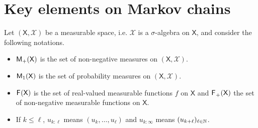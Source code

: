 \documentclass[english,graybox,envcountchap,envcountsame,sectrefs,shortlabels]{svmono}
\theoremstyle{style}
\newcommand{\Xset}{\mathsf{X}}
\newcommand{\Xsigma}{\mathcal{X}}
\begin{document}


\section{Key elements on Markov chains}
Let $(\Xset,\Xsigma)$ be a measurable space, i.e.  $\Xsigma$ is a $\sigma$-algebra on $\Xset$, and consider the following notations.
\begin{itemize}
\item $\meas +(\Xset)$ is the set of non-negative measures on $(\Xset,\Xsigma)$.
\item $\meas 1(\Xset)$ is the set of probability measures on $(\Xset,\Xsigma)$.
\item $\funcset{}(\Xset)$ is the set of real-valued measurable functions
$f$ on $\Xset$ and $\funcset{}_{+}(\Xset)$ the set of non-negative measurable
functions on $\Xset$.
\item If $k\leq\ell$,  $u_{k:\ell}$ means $(u_{k},\ldots,u_{\ell})$ and $u_{k:\infty}$ means $(u_{k+\ell})_{\ell\in\mathbb{N}}$.
\end{itemize}
\end{document}
